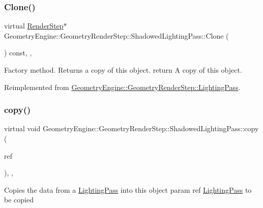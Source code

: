 \subsubsection{\texorpdfstring{Clone()}{Clone()}}
{\footnotesize\ttfamily virtual \mbox{\hyperlink{class_geometry_engine_1_1_geometry_render_step_1_1_render_step}{Render\+Step}}$\ast$ Geometry\+Engine\+::\+Geometry\+Render\+Step\+::\+Shadowed\+Lighting\+Pass\+::\+Clone (\begin{DoxyParamCaption}{ }\end{DoxyParamCaption}) const\hspace{0.3cm}{\ttfamily [inline]}, {\ttfamily [override]}, {\ttfamily [virtual]}}

Factory method. Returns a copy of this object. return A copy of this object. 

Reimplemented from \mbox{\hyperlink{class_geometry_engine_1_1_geometry_render_step_1_1_lighting_pass_a4f1cb36c7bf6a90d0aa3b8e8feba5e5e}{Geometry\+Engine\+::\+Geometry\+Render\+Step\+::\+Lighting\+Pass}}.

\mbox{\label{class_geometry_engine_1_1_geometry_render_step_1_1_shadowed_lighting_pass_add7b889c49a68911f675ee44ab656699}} 
\subsubsection{\texorpdfstring{copy()}{copy()}}
{\footnotesize\ttfamily virtual void Geometry\+Engine\+::\+Geometry\+Render\+Step\+::\+Shadowed\+Lighting\+Pass\+::copy (\begin{DoxyParamCaption}\item[{const \mbox{\hyperlink{class_geometry_engine_1_1_geometry_render_step_1_1_shadowed_lighting_pass}{Shadowed\+Lighting\+Pass}} \&}]{ref }\end{DoxyParamCaption})\hspace{0.3cm}{\ttfamily [inline]}, {\ttfamily [protected]}, {\ttfamily [virtual]}}

Copies the data from a \mbox{\hyperlink{class_geometry_engine_1_1_geometry_render_step_1_1_lighting_pass}{Lighting\+Pass}} into this object param ref \mbox{\hyperlink{class_geometry_engine_1_1_geometry_render_step_1_1_lighting_pass}{Lighting\+Pass}} to be copied \mbox{\label{class_geometry_engine_1_1_geometry_render_step_1_1_shadowed_lighting_pass_af52807435083cd96125e6ef6d7453027}} 
